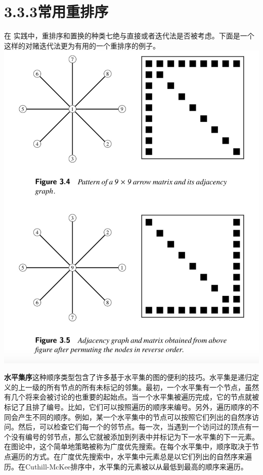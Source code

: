 \documentclass{article}
\begin{document}
\section*{3.3.3常用重排序}
在
实践中，重排序和置换的种类七绝与直接或者迭代法是否被考虑。下面是一个这样的对赌迭代法更为有用的一个重排序的例子。
\newline\newline\newline\newline\newline\newline\newline\newline
\newline\newline\newline\newline\newline\newline
\includegraphics[scale=0.25]{3_4_5.png}

\textbf{水平集序}这种顺序类型包含了许多基于水平集的图的便利的技巧。水平集是递归定义的上一级的所有节点的所有未标记的邻集。最初，一个水平集有一个节点，虽然有几个将来会被讨论的也重要的起始点。当一个水平集被遍历完成，它的节点就被标记了且排了编号。比如，它们可以按照遍历的顺序来编号。另外，遍历顺序的不同会产生不同的顺序。例如，某一个水平集中的节点可以按照它们列出的自然序访问。然后，可以检查它们每一个的邻节点。每一次，当遇到一个访问过的顶点有一个没有编号的邻节点，那么它就被添加到列表中并标记为下一水平集的下一元素。在图论中，这个简单地策略被称为广度优先搜索。在每个水平集中，顺序取决于节点遍历的方式。在广度优先搜索中，水平集中元素总是以它们列出的自然序来遍历。在Cuthill-McKee排序中，水平集的元素被以从最低到最高的顺序来遍历。
\end{document}
